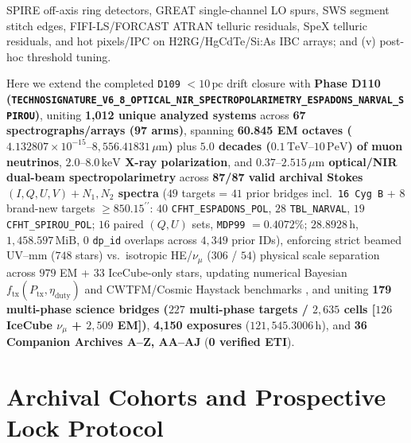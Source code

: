 \documentclass[twocolumn,10pt]{article}
\begin{document}
SPIRE off-axis ring detectors, GREAT single-channel LO spurs, SWS segment stitch edges, FIFI-LS/FORCAST ATRAN telluric residuals, SpeX telluric residuals, and hot pixels/IPC on H2RG/HgCdTe/Si:As IBC arrays; and (v) post-hoc threshold tuning.

Here we extend the completed \texttt{D109} $<10\,\text{pc}$ drift closure with \textbf{Phase D110 (\texttt{TECHNOSIGNATURE\_\allowbreak V6\_8\_\allowbreak OPTICAL\_NIR\_SPECTROPOLARIMETRY\_ESPADONS\_NARVAL\_SPIROU})}, uniting \textbf{1,012 unique analyzed systems} across \textbf{67 spectrographs/arrays (97 arms)}, spanning \textbf{60.845 EM octaves ($4.132807\times 10^{-15}\text{--}8{,}556.41831\,\mu\text{m}$)} plus \textbf{$5.0$ decades ($0.1\,\mathrm{TeV}\text{--}10\,\mathrm{PeV}$) of muon neutrinos}, \textbf{$2.0\text{--}8.0\,\mathrm{keV}$ X-ray polarization}, and \textbf{$0.37\text{--}2.515\,\mu\text{m}$ optical/NIR dual-beam spectropolarimetry} across \textbf{87/87 valid archival Stokes $(I,Q,U,V)+N_1,N_2$ spectra} ($49$ targets = $41$ prior bridges incl.\ \texttt{16\,Cyg\,B} + $8$ brand-new targets $\ge 850.15^{\prime\prime}$: $40$ \texttt{CFHT\_ESPADONS\_POL}, $28$ \texttt{TBL\_NARVAL}, $19$ \texttt{CFHT\_SPIROU\_POL}; $16$ paired $(Q,U)$ sets, \texttt{MDP99} $= 0.4072\%$; $28.8928\,\text{h}$, $1{,}458.597\,\mathrm{MiB}$, $0$ \texttt{dp\_id} overlaps across $4{,}349$ prior IDs), enforcing strict beamed UV--mm ($748$ stars) vs.\ isotropic HE/$\nu_\mu$ ($306$ / $54$) physical scale separation across $979$ EM + $33$ IceCube-only stars, updating numerical Bayesian $f_{\mathrm{tx}}(P_{\mathrm{tx}},\eta_{\mathrm{duty}})$ and CWTFM/Cosmic Haystack benchmarks \cite{Enriquez2017,Wright2018,Price2020}, and uniting \textbf{179 multi-phase science bridges ($227$ multi-phase targets / $2{,}635$ cells [$126$ IceCube $\nu_\mu$ + $2{,}509$ EM])}, \textbf{4,150 exposures} ($121{,}545.3006\,\text{h}$), and \textbf{36 Companion Archives A--Z, AA--AJ} (\textbf{0 verified ETI}).

\section{Archival Cohorts and Prospective Lock Protocol}
\end{document}
